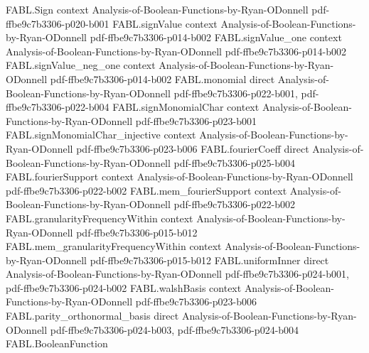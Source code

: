 \begin{theorem}
\label{FABL.majority_eq_thresholdSign_normalizedLinearForm}
\leanok
{}
\proofstep
  {FABL.Sign}
  {context}
  {Analysis-of-Boolean-Functions-by-Ryan-ODonnell}
  {pdf-ffbe9c7b3306-p020-b001}
\proofstep
  {FABL.signValue}
  {context}
  {Analysis-of-Boolean-Functions-by-Ryan-ODonnell}
  {pdf-ffbe9c7b3306-p014-b002}
\proofstep
  {FABL.signValue_one}
  {context}
  {Analysis-of-Boolean-Functions-by-Ryan-ODonnell}
  {pdf-ffbe9c7b3306-p014-b002}
\proofstep
  {FABL.signValue_neg_one}
  {context}
  {Analysis-of-Boolean-Functions-by-Ryan-ODonnell}
  {pdf-ffbe9c7b3306-p014-b002}
\proofstep
  {FABL.monomial}
  {direct}
  {Analysis-of-Boolean-Functions-by-Ryan-ODonnell}
  {pdf-ffbe9c7b3306-p022-b001,
    pdf-ffbe9c7b3306-p022-b004}
\proofstep
  {FABL.signMonomialChar}
  {context}
  {Analysis-of-Boolean-Functions-by-Ryan-ODonnell}
  {pdf-ffbe9c7b3306-p023-b001}
\proofstep
  {FABL.signMonomialChar_injective}
  {context}
  {Analysis-of-Boolean-Functions-by-Ryan-ODonnell}
  {pdf-ffbe9c7b3306-p023-b006}
\proofstep
  {FABL.fourierCoeff}
  {direct}
  {Analysis-of-Boolean-Functions-by-Ryan-ODonnell}
  {pdf-ffbe9c7b3306-p025-b004}
\proofstep
  {FABL.fourierSupport}
  {context}
  {Analysis-of-Boolean-Functions-by-Ryan-ODonnell}
  {pdf-ffbe9c7b3306-p022-b002}
\proofstep
  {FABL.mem_fourierSupport}
  {context}
  {Analysis-of-Boolean-Functions-by-Ryan-ODonnell}
  {pdf-ffbe9c7b3306-p022-b002}
\proofstep
  {FABL.granularityFrequencyWithin}
  {context}
  {Analysis-of-Boolean-Functions-by-Ryan-ODonnell}
  {pdf-ffbe9c7b3306-p015-b012}
\proofstep
  {FABL.mem_granularityFrequencyWithin}
  {context}
  {Analysis-of-Boolean-Functions-by-Ryan-ODonnell}
  {pdf-ffbe9c7b3306-p015-b012}
\proofstep
  {FABL.uniformInner}
  {direct}
  {Analysis-of-Boolean-Functions-by-Ryan-ODonnell}
  {pdf-ffbe9c7b3306-p024-b001,
    pdf-ffbe9c7b3306-p024-b002}
\proofstep
  {FABL.walshBasis}
  {context}
  {Analysis-of-Boolean-Functions-by-Ryan-ODonnell}
  {pdf-ffbe9c7b3306-p023-b006}
\proofstep
  {FABL.parity_orthonormal_basis}
  {direct}
  {Analysis-of-Boolean-Functions-by-Ryan-ODonnell}
  {pdf-ffbe9c7b3306-p024-b003,
    pdf-ffbe9c7b3306-p024-b004}
\proofstep
  {FABL.BooleanFunction}

\end{theorem}
